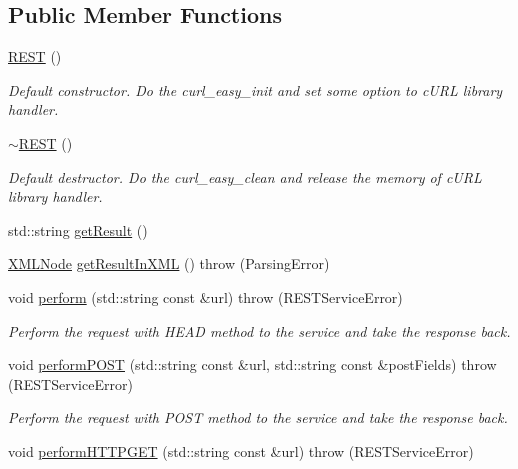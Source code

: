\subsection*{Public Member Functions}
\begin{DoxyCompactItemize}
\item 
\hyperlink{classunisys_1_1REST_a789221598cae94679e76a0dca113f674}{R\-E\-S\-T} ()
\begin{DoxyCompactList}\small\item\em Default constructor. Do the curl\-\_\-easy\-\_\-init and set some option to c\-U\-R\-L library handler. \end{DoxyCompactList}\item 
\hyperlink{classunisys_1_1REST_ad3dcca4cf53d89805b8321b9bd133398}{$\sim$\-R\-E\-S\-T} ()
\begin{DoxyCompactList}\small\item\em Default destructor. Do the curl\-\_\-easy\-\_\-clean and release the memory of c\-U\-R\-L library handler. \end{DoxyCompactList}\item 
std\-::string \hyperlink{classunisys_1_1REST_a1c2c3acc8f68cb4b31ead307902e82ff}{get\-Result} ()
\item 
\hyperlink{structXMLNode}{X\-M\-L\-Node} \hyperlink{classunisys_1_1REST_a3056a56b223a8dd7839976237fa41173}{get\-Result\-In\-X\-M\-L} ()  throw (\-Parsing\-Error)
\item 
void \hyperlink{classunisys_1_1REST_ab6e0f9040de9b531a442baec762719c3}{perform} (std\-::string const \&url)  throw (\-R\-E\-S\-T\-Service\-Error)
\begin{DoxyCompactList}\small\item\em Perform the request with H\-E\-A\-D method to the service and take the response back. \end{DoxyCompactList}\item 
void \hyperlink{classunisys_1_1REST_a30a933ea373cd52be4d67939ea574cfe}{perform\-P\-O\-S\-T} (std\-::string const \&url, std\-::string const \&post\-Fields)  throw (\-R\-E\-S\-T\-Service\-Error)
\begin{DoxyCompactList}\small\item\em Perform the request with P\-O\-S\-T method to the service and take the response back. \end{DoxyCompactList}\item 
void \hyperlink{classunisys_1_1REST_a44bbc3a0354f7fc82cfd912ea964de48}{perform\-H\-T\-T\-P\-G\-E\-T} (std\-::string const \&url)  throw (\-R\-E\-S\-T\-Service\-Error)

\end{DoxyCompactItemize}
